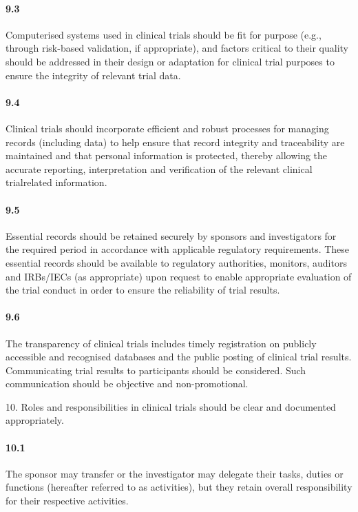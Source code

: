 \documentclass[11pt]{article}
\begin{document}
\paragraph{9.3} Computerised systems used in clinical trials should be fit for purpose (e.g., through risk-based validation, if appropriate), and factors critical to their quality should be addressed in their design or adaptation for clinical trial purposes to ensure the integrity of relevant trial data.

\paragraph{9.4} Clinical trials should incorporate efficient and robust processes for managing records (including data) to help ensure that record integrity and traceability are maintained and that personal information is protected, thereby allowing the accurate reporting, interpretation and verification of the relevant clinical trialrelated information.

\paragraph{9.5} Essential records should be retained securely by sponsors and investigators for the required period in accordance with applicable regulatory requirements. These essential records should be available to regulatory authorities, monitors, auditors and IRBs/IECs (as appropriate) upon request to enable appropriate evaluation of the trial conduct in order to ensure the reliability of trial results.

\paragraph{9.6} The transparency of clinical trials includes timely registration on publicly accessible and recognised databases and the public posting of clinical trial results. Communicating trial results to participants should be considered. Such communication should be objective and non-promotional.

10. Roles and responsibilities in clinical trials should be clear and documented appropriately.


\paragraph{10.1} The sponsor may transfer or the investigator may delegate their tasks, duties or functions (hereafter referred to as activities), but they retain overall responsibility for their respective activities.
\end{document}
